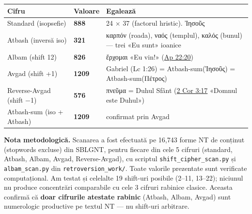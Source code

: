 \documentclass[12pt,a4paper,twoside,openany]{book}
\begin{document}
\begin{center}
\small
\begin{tabular}{L{3.5cm}C{1.5cm}L{8.5cm}}
\toprule
{}
\textbf{Cifru} & \textbf{Valoare} & \textbf{Egalează} \\
\midrule
Standard (isopsefie) & \textbf{888} & 24 $\times$ 37 (factorul hristic). Ἰησοῦς \\
Atbash (inversă iso) & \textbf{321} & καρπόν (roada), ναός (templul), καλός (bunul) --- trei «Eu sunt» ioanice \\
Albam (shift 12) & \textbf{826} & ἔρχομαι «Eu vin!» (\href{https://bibliaortodoxa.ro/carte.php?id=78\&cap=22\#20}{Ap 22:20}) \\
Avgad (shift +1) & \textbf{1209} & Gabriel (Lc 1:26) = Atbash-sum(Ἰησοῦς) = Atbash-sum(Πέτρος) \\
Reverse-Avgad (shift $-$1) & \textbf{576} & πνεῦμα = Duhul Sfânt (\href{https://bibliaortodoxa.ro/carte.php?id=68\&cap=3\#17}{2 Cor 3:17} «Domnul este Duhul») \\
Atbash-sum (iso + Atbash) & \textbf{1209} & confirmat prin Avgad \\
\bottomrule
\end{tabular}
\end{center}

\textbf{Nota metodologică.} Scanarea a fost efectuată pe 16{,}743 forme NT de conținut (stopwords excluse) din SBLGNT, pentru fiecare din cele 5 cifruri (standard, Atbash, Albam, Avgad, Reverse-Avgad), cu scriptul \texttt{shift\_cipher\_scan.py} și \texttt{albam\_scan.py} din \texttt{retroversion\_work/}. Toate valorile prezentate sunt verificate computațional. Am testat și celelalte 19 shift-uri posibile (2--11, 13--22); niciunul nu produce concentrări comparabile cu cele 3 cifruri rabinice clasice. Aceasta confirmă că \textbf{doar cifrurile atestate rabinic} (Atbash, Albam, Avgad) sunt numerologic productive pe textul NT --- nu shift-uri arbitrare.
\end{document}
